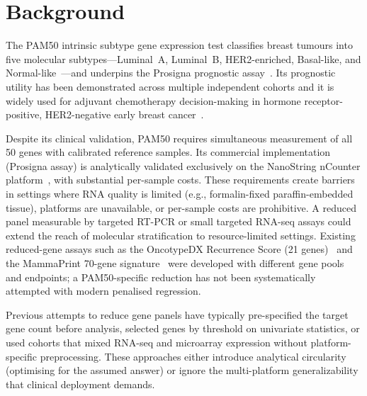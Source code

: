 \documentclass[referee,lineno,pdflatex,sn-vancouver-num]{sn-jnl}
\begin{document}

\maketitle

\section{Background}\label{sec:background}

The PAM50 intrinsic subtype gene expression test classifies breast tumours into five molecular subtypes---Luminal~A, Luminal~B, HER2-enriched, Basal-like, and Normal-like~\cite{perou2000,sorlie2001}---and underpins the Prosigna prognostic assay~\cite{parker2009}. Its prognostic utility has been demonstrated across multiple independent cohorts and it is widely used for adjuvant chemotherapy decision-making in hormone receptor-positive, HER2-negative early breast cancer~\cite{cardoso2016,sparano2018}.

Despite its clinical validation, PAM50 requires simultaneous measurement of all 50 genes with calibrated reference samples. Its commercial implementation (Prosigna assay) is analytically validated exclusively on the NanoString nCounter platform~\cite{nielsen2014}, with substantial per-sample costs. These requirements create barriers in settings where RNA quality is limited (e.g., formalin-fixed paraffin-embedded tissue), platforms are unavailable, or per-sample costs are prohibitive. A reduced panel measurable by targeted RT-PCR or small targeted RNA-seq assays could extend the reach of molecular stratification to resource-limited settings. Existing reduced-gene assays such as the OncotypeDX Recurrence Score (21 genes)~\cite{paik2004} and the MammaPrint 70-gene signature~\cite{vantveer2002} were developed with different gene pools and endpoints; a PAM50-specific reduction has not been systematically attempted with modern penalised regression.

Previous attempts to reduce gene panels have typically pre-specified the target gene count before analysis, selected genes by threshold on univariate statistics, or used cohorts that mixed RNA-seq and microarray expression without platform-specific preprocessing. These approaches either introduce analytical circularity (optimising for the assumed answer) or ignore the multi-platform generalizability that clinical deployment demands.
\end{document}
